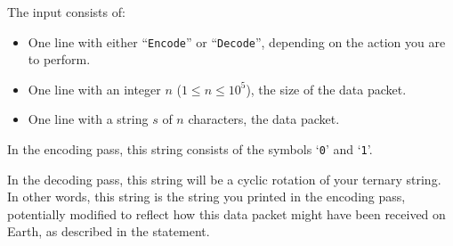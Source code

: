 
    The input consists of:
    \begin{itemize}
        \item One line with either ``\texttt{Encode}'' or ``\texttt{Decode}'', depending on the action you are to perform.
        \item One line with an integer $n$ ($1 \leq n \leq 10^5$), the size of the data packet.
        \item One line with a string $s$ of $n$ characters, the data packet.
    \end{itemize}

    In the encoding pass, this string consists of the symbols `\texttt{0}' and `\texttt{1}'.

    In the decoding pass, this string will be a cyclic rotation of your ternary string. In other words, this string is the string you printed in the encoding pass, potentially modified to reflect how this data packet might have been received on Earth, as described in the statement.

